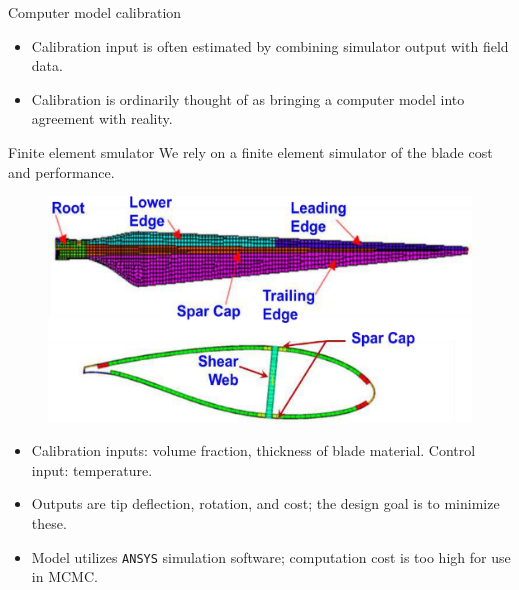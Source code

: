 \documentclass[final]{beamer}
\newlength{\onecolwid}
\begin{document}
\begin{frame}[t]
\begin{columns}[t]
\begin{column}{\onecolwid}
\begin{alertblock}{Computer model calibration}
\begin{itemize}

\item Calibration input is often estimated by combining simulator output with field data. 

\item Calibration is ordinarily thought of as bringing a computer model into agreement with reality.

\end{itemize}

\end{alertblock}


\begin{alertblock}{Finite element smulator}
We rely on a finite element simulator of the blade cost and performance.

\begin{figure}[h!]
\includegraphics[width=0.6\linewidth]{blade3}
\label{blade}
\end{figure}

\vspace{-18mm}
\begin{itemize}
\item Calibration inputs: volume fraction, thickness of blade material. Control input: temperature.


\item Outputs are tip deflection, rotation, and cost; the design goal is to minimize these.

\item Model utilizes \texttt{ANSYS} simulation software; computation cost is too high for use in MCMC.


\end{itemize}
\end{alertblock}
\end{column}
\end{columns}
\end{frame}
\end{document}
